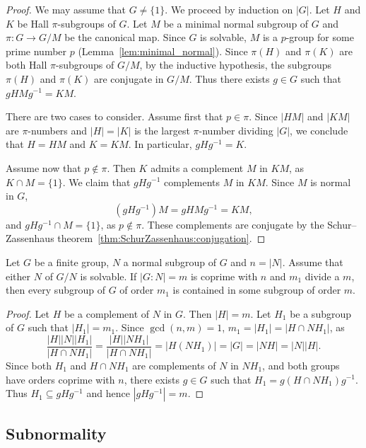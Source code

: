\begin{proof}
	We may assume that $G\ne\{1\}$. We proceed by induction on $|G|$.  Let $H$
	and $K$ be Hall $\pi$-subgroups of $G$. Let $M$ be a minimal normal subgroup of 
    $G$ and $\pi\colon G\to G/M$ be the canonical map. Since $G$ is solvable, 
	$M$ is a $p$-group for some prime number $p$ (Lemma~\ref{lem:minimal_normal}). 
    Since $\pi(H)$ and $\pi(K)$ are both Hall 
	$\pi$-subgroups of $G/M$, by the inductive hypothesis, 
    the subgroups $\pi(H)$ and $\pi(K)$ are 
	conjugate in $G/M$. Thus there exists $g\in G$ such that $gHMg^{-1}=KM$. 

	There are two cases to consider. Assume first that $p\in\pi$. Since $|HM|$ and 
	$|KM|$ are $\pi$-numbers and $|H|=|K|$ is the largest $\pi$-number dividing $|G|$, 
    we conclude that $H=HM$ and $K=KM$. In particular, $gHg^{-1}=K$. 

	Assume now that $p\not\in\pi$. Then $K$ admits a complement $M$ in 
 	$KM$, as $K\cap M=\{1\}$. We claim that $gHg^{-1}$ complements $M$ in $KM$. Since 
	$M$ is normal in $G$, 
 	\[
	(gHg^{-1})M=gHMg^{-1}=KM,
	\]
	and $gHg^{-1}\cap M=\{1\}$, as $p\not\in\pi$. These complements are conjugate 
    by the Schur--Zassenhaus theorem~\ref{thm:SchurZassenhaus:conjugation}.
\end{proof}

\begin{corollary}
	Let $G$ be a finite group, $N$ a normal subgroup of $G$ and $n=|N|$. 
 	Assume that either $N$ of $G/N$ is solvable. 
    If $|G:N|=m$ is coprime with $n$ and 
    $m_1$ divide a $m$, then every subgroup of $G$ of order $m_1$ 
    is contained in some subgroup of order $m$. 
\end{corollary}

\begin{proof}
	Let $H$ be a complement of $N$ in $G$. Then $|H|=m$. Let $H_1$
	be a subgroup of $G$ such that $|H_1|=m_1$. 
	Since $\gcd(n,m)=1$, $m_1=|H_1|=|H\cap NH_1|$, as 
	\[
	\frac{|H||N||H_1|}{|H\cap NH_1|}=
	\frac{|H||NH_1|}{|H\cap NH_1|}=|H(NH_1)|=|G|=|NH|=|N||H|.
	\]
	Since both $H_1$ and $H\cap NH_1$ are complements of $N$ in $NH_1$, and both 
    groups have orders coprime with $n$, there exists 
	$g\in G$ such that $H_1=g(H\cap NH_1)g^{-1}$. Thus  
	$H_1\subseteq gHg^{-1}$ and hence $|gHg^{-1}|=m$. 
\end{proof}


\subsection{Subnormality}

